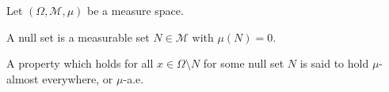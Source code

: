 %
%
%
%
\begin{definition}
  Let $\left(\Omega,\mathcal{M},\mu\right)$ be a measure space.\newline

  A null set is a measurable set $N\in \mathcal{M}$ with $\mu\left(N\right) = 0$.\newline

  A property which holds for all $x\in \Omega\setminus N$ for some null set $N$ is said to hold $\mu$-almost everywhere, or $\mu$-a.e.
\end{definition}
